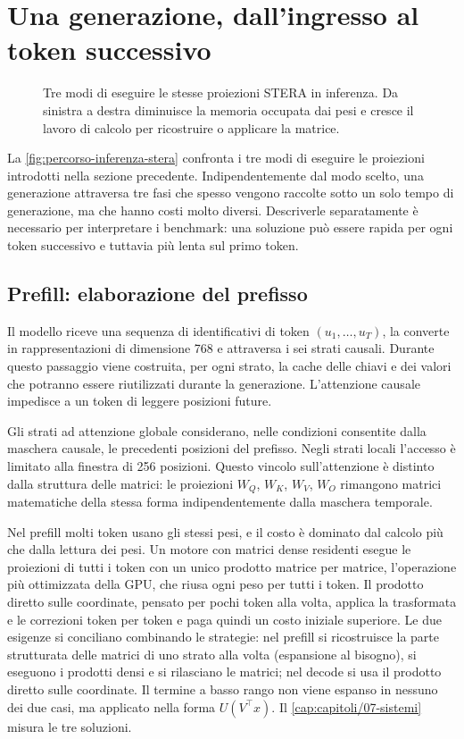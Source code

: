 
\section{Una generazione, dall'ingresso al token successivo}
\label{sec:guida-inferenza-stera}

\begin{figure}[htbp]
\centering

\caption{Tre modi di eseguire le stesse proiezioni STERA in inferenza. Da sinistra a destra diminuisce la memoria occupata dai pesi e cresce il lavoro di calcolo per ricostruire o applicare la matrice.}
\label{fig:percorso-inferenza-stera}
\end{figure}

La \autoref{fig:percorso-inferenza-stera} confronta i tre modi di eseguire le proiezioni introdotti nella sezione precedente. Indipendentemente dal modo scelto, una generazione attraversa tre fasi che spesso vengono raccolte sotto un solo tempo di generazione, ma che hanno costi molto diversi. Descriverle separatamente è necessario per interpretare i benchmark: una soluzione può essere rapida per ogni token successivo e tuttavia più lenta sul primo token.

\subsection{Prefill: elaborazione del prefisso}
\label{sec:prefill-guida}

Il modello riceve una sequenza di identificativi di token $(u_1,\dots,u_T)$, la converte in rappresentazioni di dimensione 768 e attraversa i sei strati causali. Durante questo passaggio viene costruita, per ogni strato, la cache delle chiavi e dei valori che potranno essere riutilizzati durante la generazione. L'attenzione causale impedisce a un token di leggere posizioni future.

Gli strati ad attenzione globale considerano, nelle condizioni consentite dalla maschera causale, le precedenti posizioni del prefisso. Negli strati locali l'accesso è limitato alla finestra di 256 posizioni. Questo vincolo sull'attenzione è distinto dalla struttura delle matrici: le proiezioni $W_Q$, $W_K$, $W_V$, $W_O$ rimangono matrici matematiche della stessa forma indipendentemente dalla maschera temporale.

Nel prefill molti token usano gli stessi pesi, e il costo è dominato dal calcolo più che dalla lettura dei pesi. Un motore con matrici dense residenti esegue le proiezioni di tutti i token con un unico prodotto matrice per matrice, l'operazione più ottimizzata della GPU, che riusa ogni peso per tutti i token. Il prodotto diretto sulle coordinate, pensato per pochi token alla volta, applica la trasformata e le correzioni token per token e paga quindi un costo iniziale superiore. Le due esigenze si conciliano combinando le strategie: nel prefill si ricostruisce la parte strutturata delle matrici di uno strato alla volta (espansione al bisogno), si eseguono i prodotti densi e si rilasciano le matrici; nel decode si usa il prodotto diretto sulle coordinate. Il termine a basso rango non viene espanso in nessuno dei due casi, ma applicato nella forma $U(V^\top x)$. Il \autoref{cap:capitoli/07-sistemi} misura le tre soluzioni.

